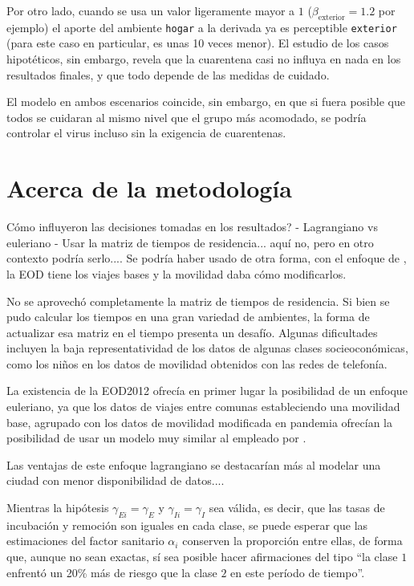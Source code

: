 Por otro lado, cuando se usa un valor ligeramente mayor a \(1\) (\(\beta_{\text{exterior}} = 1.2\) por ejemplo) el aporte del ambiente \texttt{hogar} a la derivada ya es perceptible \texttt{exterior} (para este caso en particular, es unas 10 veces menor). El estudio de los casos hipotéticos, sin embargo, revela que la cuarentena casi no influya en nada en los resultados finales, y que todo depende de las medidas de cuidado.

El modelo en ambos escenarios coincide, sin embargo, en que si fuera posible que todos se cuidaran al mismo nivel que el grupo más acomodado, se podría controlar el virus incluso sin la exigencia de cuarentenas.

\section{Acerca de la metodología}

  

Cómo influyeron las decisiones tomadas en los resultados? 
- Lagrangiano vs euleriano 
- Usar la matriz de tiempos de residencia... aquí no, pero en otro contexto podría serlo.... Se podría haber usado de otra forma, con el enfoque de \cite{Chang2021}, la EOD tiene los viajes bases y la movilidad daba cómo modificarlos.

No se aprovechó completamente la matriz de tiempos de residencia. Si bien se pudo calcular los tiempos en una gran variedad de ambientes, la forma de actualizar esa matriz en el tiempo presenta un desafío. Algunas dificultades incluyen la baja representatividad de los datos de algunas clases socieoconómicas, como los niños en los datos de movilidad obtenidos con las redes de telefonía. 

La existencia de la EOD2012 ofrecía en primer lugar la posibilidad de un enfoque euleriano, ya que los datos de viajes entre comunas estableciendo una movilidad base, agrupado con los datos de movilidad modificada en pandemia ofrecían la posibilidad de usar un modelo muy similar al empleado por \cite{Lai2020}.


Las ventajas de este enfoque lagrangiano se destacarían más al modelar una ciudad con menor disponibilidad de datos....


Mientras la hipótesis \(\gamma_{Ei} = \gamma_E\) y \(\gamma_{Ii} = \gamma_I\) sea válida, es decir, que las tasas de incubación y remoción son iguales en cada clase, se puede esperar que las estimaciones del factor sanitario \(\alpha_i\) conserven la proporción entre ellas, de forma que, aunque no sean exactas, sí sea posible hacer afirmaciones del tipo ``la clase \(1\) enfrentó un 20\% más de riesgo que la clase \(2\) en este período de tiempo''. 

